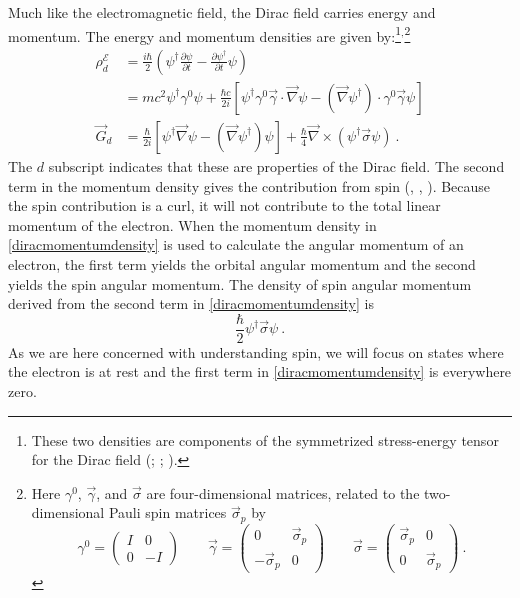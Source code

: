 \documentclass[onecolumn,secnumarabic,amsmath,amssymb,balancelastpage,nofootinbib]{article}
\begin{document}
Much like the electromagnetic field, the Dirac field carries energy and momentum.  The energy and momentum densities are given by:\footnote{These two densities are components of the symmetrized stress-energy tensor for the Dirac field (\citealp[section 20]{wentzel}; \citealp[appendix 7]{heitler}; \citealp[pg.\ 218--221]{weyl}).}$^,$\footnote{Here $\gamma^0$, $\vec{\gamma}$, and $\vec{\sigma}$ are four-dimensional matrices, related to the two-dimensional Pauli spin matrices $\vec{\sigma}_p$ by
\begin{equation}
\gamma^0=\left(\begin{matrix} I & 0 \\  0 & -I \end{matrix}\right)
\quad\quad
\vec{\gamma}=\left(\begin{matrix}0 & \vec{\sigma}_p \\  -\vec{\sigma}_p & 0 \end{matrix}\right)
\quad\quad
\vec{\sigma}=\left(\begin{matrix}\vec{\sigma}_p & 0 \\ 0 & \vec{\sigma}_p \end{matrix}\right)\ .
\label{matrixdefs}
\end{equation}}
\begin{align}
\rho_d^{\mathcal{E}}&=\frac{i \hbar}{2}\left(\psi^\dagger\frac{\partial \psi}{\partial t}-\frac{\partial \psi^\dagger}{\partial t}\psi\right)
\nonumber
\\
&=m c^2 \psi^\dagger\gamma^0\psi + \frac{\hbar c}{2i}\left[\psi^\dagger\gamma^0\vec{\gamma}\cdot\vec{\nabla}\psi-(\vec{\nabla} \psi^\dagger)\cdot\gamma^0\vec{\gamma}\psi\right] 
\label{diracenergydensity}
\\
\vec{G}_d&=\frac{\hbar}{2 i}\left[\psi^\dagger \vec{\nabla} \psi - (\vec{\nabla} \psi^\dagger)\psi \right]+\frac{\hbar}{4}\vec{\nabla}\times(\psi^\dagger \vec{\sigma} \psi)\ .
\label{diracmomentumdensity}
\end{align}
The $d$ subscript indicates that these are properties of the Dirac field.    The second term in the momentum density gives the contribution from spin (\citealp[pg.\ 181--182]{wentzel}, \citealp[pg.\ 168]{pauli}, \citealp[pg.\ 503]{ohanian}).  Because the spin contribution is a curl, it will not contribute to the total linear momentum of the electron.  When the momentum density in \eqref{diracmomentumdensity} is used to calculate the angular momentum of an electron, the first term yields the orbital angular momentum and the second yields the spin angular momentum.  The density of spin angular momentum derived from the second term in \eqref{diracmomentumdensity} is
\begin{equation}
\frac{\hbar}{2}\psi^\dagger \vec{\sigma} \psi\ .
\label{diracspinangularmomentumdensity}
\end{equation}
As we are here concerned with understanding spin, we will focus on states where the electron is at rest and the first term in \eqref{diracmomentumdensity} is everywhere zero.
\end{document}

